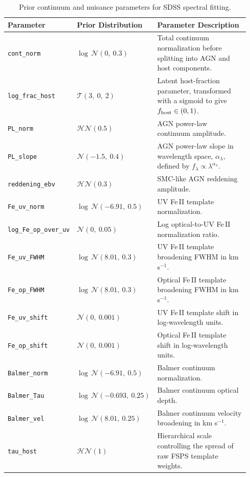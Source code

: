 \begin{table}[ht]
\centering
\caption{Prior continuum and nuisance parameters for SDSS spectral fitting.}
\begin{tabular}{p{0.22\linewidth} p{0.30\linewidth} p{0.42\linewidth}}
\hline
\textbf{Parameter} & \textbf{Prior Distribution} & \textbf{Parameter Description} \\
\hline
\texttt{cont\_norm} & $\log\,\mathcal{N}(0,\ 0.3)$ & Total continuum normalization before splitting into AGN and host components. \\
\texttt{log\_frac\_host} & $\mathcal{T}(3,\ 0,\ 2)$ & Latent host-fraction parameter, transformed with a sigmoid to give $f_{\rm host}\in(0,1)$. \\
\texttt{PL\_norm} & $\mathcal{HN}(0.5)$ & AGN power-law continuum amplitude. \\
\texttt{PL\_slope} & $\mathcal{N}(-1.5,\ 0.4)$ & AGN power-law slope in wavelength space, $\alpha_\lambda$, defined by $f_\lambda\propto\lambda^{\alpha_\lambda}$. \\
\texttt{reddening\_ebv} & $\mathcal{HN}(0.3)$ & SMC-like AGN reddening amplitude. \\
\texttt{Fe\_uv\_norm} & $\log\,\mathcal{N}(-6.91,\ 0.5)$ & UV Fe\,II template normalization. \\
\texttt{log\_Fe\_op\_over\_uv} & $\mathcal{N}(0,\ 0.05)$ & Log optical-to-UV Fe\,II normalization ratio. \\
\texttt{Fe\_uv\_FWHM} & $\log\,\mathcal{N}(8.01,\ 0.3)$ & UV Fe\,II template broadening FWHM in km s$^{-1}$. \\
\texttt{Fe\_op\_FWHM} & $\log\,\mathcal{N}(8.01,\ 0.3)$ & Optical Fe\,II template broadening FWHM in km s$^{-1}$. \\
\texttt{Fe\_uv\_shift} & $\mathcal{N}(0,\ 0.001)$ & UV Fe\,II template shift in log-wavelength units. \\
\texttt{Fe\_op\_shift} & $\mathcal{N}(0,\ 0.001)$ & Optical Fe\,II template shift in log-wavelength units. \\
\texttt{Balmer\_norm} & $\log\,\mathcal{N}(-6.91,\ 0.5)$ & Balmer continuum normalization. \\
\texttt{Balmer\_Tau} & $\log\,\mathcal{N}(-0.693,\ 0.25)$ & Balmer continuum optical depth. \\
\texttt{Balmer\_vel} & $\log\,\mathcal{N}(8.01,\ 0.25)$ & Balmer continuum velocity broadening in km s$^{-1}$. \\
\texttt{tau\_host} & $\mathcal{HN}(1)$ & Hierarchical scale controlling the spread of raw FSPS template weights. \\

\end{tabular}
\end{table}
